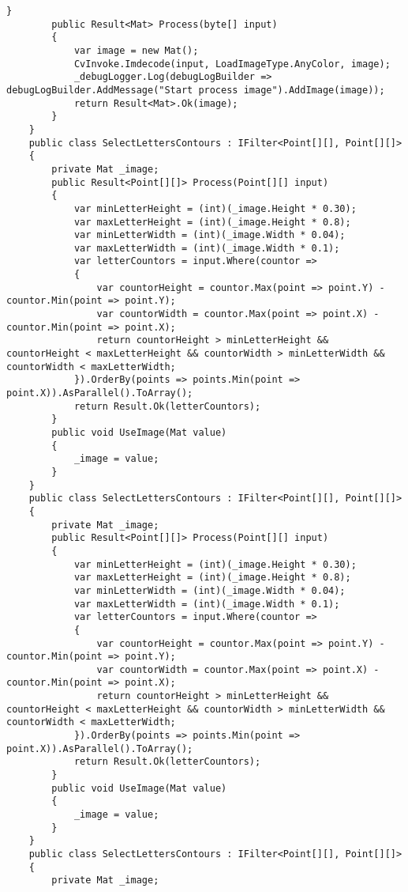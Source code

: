 \begin{lstlisting}[style=fsharpstyle,caption={Исходный код}, label=lst:recognition_result_handler]
        }
        public Result<Mat> Process(byte[] input)
        {
            var image = new Mat();
            CvInvoke.Imdecode(input, LoadImageType.AnyColor, image);
            _debugLogger.Log(debugLogBuilder => debugLogBuilder.AddMessage("Start process image").AddImage(image));
            return Result<Mat>.Ok(image);
        }
    }
    public class SelectLettersContours : IFilter<Point[][], Point[][]>
    {
        private Mat _image;
        public Result<Point[][]> Process(Point[][] input)
        {
            var minLetterHeight = (int)(_image.Height * 0.30);
            var maxLetterHeight = (int)(_image.Height * 0.8);
            var minLetterWidth = (int)(_image.Width * 0.04);
            var maxLetterWidth = (int)(_image.Width * 0.1);
            var letterCountors = input.Where(countor =>
            {
                var countorHeight = countor.Max(point => point.Y) - countor.Min(point => point.Y);
                var countorWidth = countor.Max(point => point.X) - countor.Min(point => point.X);
                return countorHeight > minLetterHeight && countorHeight < maxLetterHeight && countorWidth > minLetterWidth && countorWidth < maxLetterWidth;
            }).OrderBy(points => points.Min(point => point.X)).AsParallel().ToArray();
            return Result.Ok(letterCountors);
        }
        public void UseImage(Mat value)
        {
            _image = value;
        }
    }
    public class SelectLettersContours : IFilter<Point[][], Point[][]>
    {
        private Mat _image;
        public Result<Point[][]> Process(Point[][] input)
        {
            var minLetterHeight = (int)(_image.Height * 0.30);
            var maxLetterHeight = (int)(_image.Height * 0.8);
            var minLetterWidth = (int)(_image.Width * 0.04);
            var maxLetterWidth = (int)(_image.Width * 0.1);
            var letterCountors = input.Where(countor =>
            {
                var countorHeight = countor.Max(point => point.Y) - countor.Min(point => point.Y);
                var countorWidth = countor.Max(point => point.X) - countor.Min(point => point.X);
                return countorHeight > minLetterHeight && countorHeight < maxLetterHeight && countorWidth > minLetterWidth && countorWidth < maxLetterWidth;
            }).OrderBy(points => points.Min(point => point.X)).AsParallel().ToArray();
            return Result.Ok(letterCountors);
        }
        public void UseImage(Mat value)
        {
            _image = value;
        }
    }
    public class SelectLettersContours : IFilter<Point[][], Point[][]>
    {
        private Mat _image;

\end{lstlisting}

